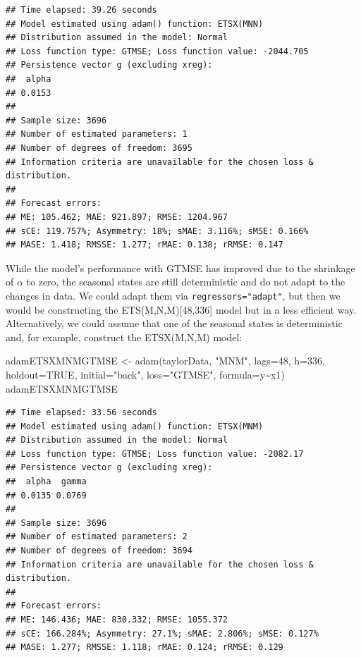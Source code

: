 \documentclass[
]{book}
\newenvironment{Shaded}{\begin{snugshade}}{\end{snugshade}}
\newcommand{\AttributeTok}[1]{\textcolor[rgb]{0.77,0.63,0.00}{#1}}
\newcommand{\ConstantTok}[1]{\textcolor[rgb]{0.00,0.00,0.00}{#1}}
\newcommand{\DecValTok}[1]{\textcolor[rgb]{0.00,0.00,0.81}{#1}}
\newcommand{\FunctionTok}[1]{\textcolor[rgb]{0.00,0.00,0.00}{#1}}
\newcommand{\NormalTok}[1]{#1}
\newcommand{\OtherTok}[1]{\textcolor[rgb]{0.56,0.35,0.01}{#1}}
\newcommand{\SpecialCharTok}[1]{\textcolor[rgb]{0.00,0.00,0.00}{#1}}
\newcommand{\StringTok}[1]{\textcolor[rgb]{0.31,0.60,0.02}{#1}}
\theoremstyle{definition}
\theoremstyle{definition}
\theoremstyle{definition}
\theoremstyle{definition}
\theoremstyle{remark}
\begin{document}
\begin{verbatim}
## Time elapsed: 39.26 seconds
## Model estimated using adam() function: ETSX(MNN)
## Distribution assumed in the model: Normal
## Loss function type: GTMSE; Loss function value: -2044.705
## Persistence vector g (excluding xreg):
##  alpha 
## 0.0153 
## 
## Sample size: 3696
## Number of estimated parameters: 1
## Number of degrees of freedom: 3695
## Information criteria are unavailable for the chosen loss & distribution.
## 
## Forecast errors:
## ME: 105.462; MAE: 921.897; RMSE: 1204.967
## sCE: 119.757%; Asymmetry: 18%; sMAE: 3.116%; sMSE: 0.166%
## MASE: 1.418; RMSSE: 1.277; rMAE: 0.138; rRMSE: 0.147
\end{verbatim}

While the model's performance with GTMSE has improved due to the shrinkage of \(\alpha\) to zero, the seasonal states are still deterministic and do not adapt to the changes in data. We could adapt them via \texttt{regressors="adapt"}, but then we would be constructing the ETS(M,N,M){[}48,336{]} model but in a less efficient way. Alternatively, we could assume that one of the seasonal states is deterministic and, for example, construct the ETSX(M,N,M) model:

\begin{Shaded}
\begin{Highlighting}[]
\NormalTok{adamETSXMNMGTMSE }\OtherTok{\textless{}{-}} \FunctionTok{adam}\NormalTok{(taylorData, }\StringTok{"MNM"}\NormalTok{, }\AttributeTok{lags=}\DecValTok{48}\NormalTok{,}
                         \AttributeTok{h=}\DecValTok{336}\NormalTok{, }\AttributeTok{holdout=}\ConstantTok{TRUE}\NormalTok{,}
                         \AttributeTok{initial=}\StringTok{"back"}\NormalTok{, }\AttributeTok{loss=}\StringTok{"GTMSE"}\NormalTok{,}
                         \AttributeTok{formula=}\NormalTok{y}\SpecialCharTok{\textasciitilde{}}\NormalTok{x1)}
\NormalTok{adamETSXMNMGTMSE}
\end{Highlighting}
\end{Shaded}

\begin{verbatim}
## Time elapsed: 33.56 seconds
## Model estimated using adam() function: ETSX(MNM)
## Distribution assumed in the model: Normal
## Loss function type: GTMSE; Loss function value: -2082.17
## Persistence vector g (excluding xreg):
##  alpha  gamma 
## 0.0135 0.0769 
## 
## Sample size: 3696
## Number of estimated parameters: 2
## Number of degrees of freedom: 3694
## Information criteria are unavailable for the chosen loss & distribution.
## 
## Forecast errors:
## ME: 146.436; MAE: 830.332; RMSE: 1055.372
## sCE: 166.284%; Asymmetry: 27.1%; sMAE: 2.806%; sMSE: 0.127%
## MASE: 1.277; RMSSE: 1.118; rMAE: 0.124; rRMSE: 0.129
\end{verbatim}
\end{document}

